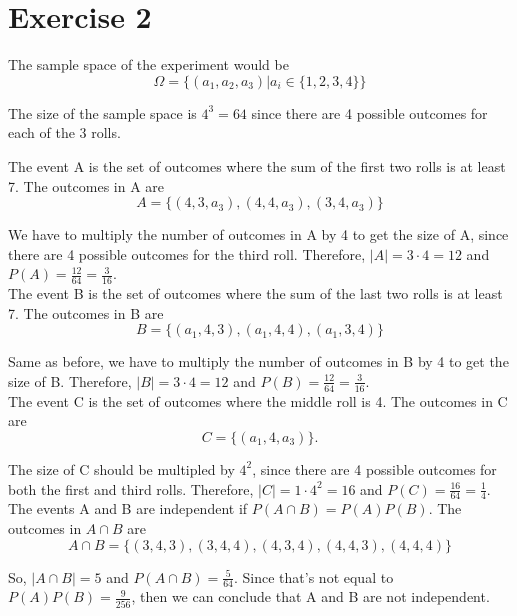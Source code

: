 \section{Exercise 2}

The sample space of the experiment would be
\[
	\Omega = \{(a_1, a_2, a_3) | a_i \in \{1, 2, 3, 4\}\}
\]

The size of the sample space is $4^3 = 64$ since there are 4 possible outcomes for each of the 3 rolls.

The event A is the set of outcomes where the sum of the first two rolls is at least 7. The outcomes in A are
\[
	A = \{(4, 3, a_3), (4, 4, a_3), (3, 4, a_3)\}
\]

We have to multiply the number of outcomes in A by 4 to get the size of A, since there are 4 possible outcomes for the third roll. Therefore, $|A| = 3 \cdot 4 = 12$ and $P(A) = \frac{12}{64} = \frac{3}{16}$.\\[1em]

The event B is the set of outcomes where the sum of the last two rolls is at least 7. The outcomes in B are
\[
	B = \{(a_1, 4, 3), (a_1, 4, 4), (a_1, 3, 4)\}
\]

Same as before, we have to multiply the number of outcomes in B by 4 to get the size of B. Therefore, $|B| = 3 \cdot 4 = 12$ and $P(B) = \frac{12}{64} = \frac{3}{16}$.\\[1em]

The event C is the set of outcomes where the middle roll is 4. The outcomes in C are
\[
	C = \{(a_1, 4, a_3)\}.
\]

The size of C should be multipled by $4^2$, since there are 4 possible outcomes for both the first and third rolls. Therefore, $|C| = 1 \cdot 4^2 = 16$ and $P(C) = \frac{16}{64} = \frac{1}{4}$.\\[1em]

The events A and B are independent if $P(A \cap B) = P(A)P(B)$. The outcomes in $A \cap B$ are
\[
	A \cap B = \{(3, 4, 3), (3, 4, 4), (4, 3, 4), (4, 4, 3), (4,4,4)\}
\]

So, $|A \cap B| = 5$ and $P(A \cap B) = \frac{5}{64}$. Since that's not equal to $P(A)P(B) = \frac{9}{256}$, then we can conclude that A and B are not independent.\\[1em]

